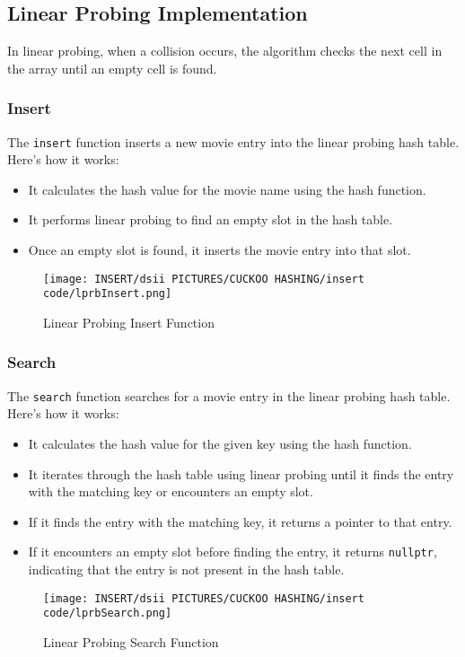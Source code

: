 \documentclass[12pt]{article}
\begin{document}
\subsection{Linear Probing Implementation}
In linear probing, when a collision occurs, the algorithm checks the next cell in the array until an empty cell is found.
\subsubsection{Insert}
The \texttt{insert} function inserts a new movie entry into the linear probing hash table. Here's how it works:
\begin{itemize}
    \item It calculates the hash value for the movie name using the hash function.
    \item It performs linear probing to find an empty slot in the hash table.
    \item Once an empty slot is found, it inserts the movie entry into that slot.
\end{itemize}

\begin{figure}[htbp]
    \centering
    \texttt{[image: INSERT/dsii PICTURES/CUCKOO HASHING/insert code/lprbInsert.png]}
    \caption{Linear Probing Insert Function}
    \label{fig:insertion_step1}
\end{figure}
\newpage

\subsubsection{Search}
The \texttt{search} function searches for a movie entry in the linear probing hash table. Here's how it works:
\begin{itemize}
    \item It calculates the hash value for the given key using the hash function.
    \item It iterates through the hash table using linear probing until it finds the entry with the matching key or encounters an empty slot.
    \item If it finds the entry with the matching key, it returns a pointer to that entry.
    \item If it encounters an empty slot before finding the entry, it returns \texttt{nullptr}, indicating that the entry is not present in the hash table.
\end{itemize}

\begin{figure}[htbp]
    \centering
    \texttt{[image: INSERT/dsii PICTURES/CUCKOO HASHING/insert code/lprbSearch.png]}
    \caption{Linear Probing Search Function}
    \label{fig:insertion_step1}
\end{figure}
\end{document}
